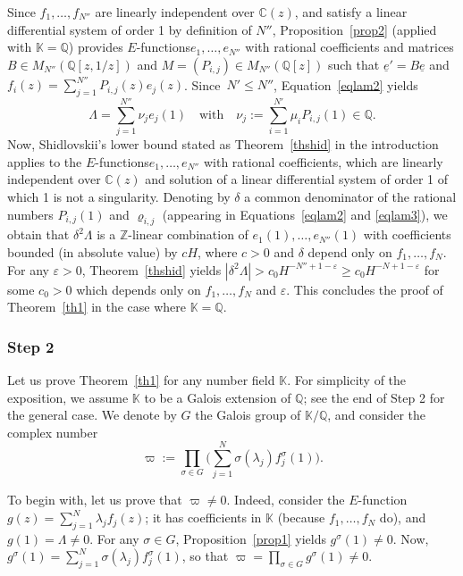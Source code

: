\documentclass[11pt]{article}
\numberwithin{equation}{section}
\newcommand{\Efunction}{$E$\nobreakdash-func\-tion\xspace}
\newcommand{\Efunctions}{$E$\nobreakdash-func\-tions\xspace}
\theoremstyle{definition}
\newcommand{\Z}{\mathbb{Z}}
\newcommand{\Q}{\mathbb{Q}}
\newcommand{\C}{\mathbb{C}}
\newcommand{\K}{\mathbb{K}}
\let\eps\varepsilon
\begin{document}
Since $f_1,\ldots,f_{N''}$ are linearly independent over $\C(z)$, and satisfy a linear differential system of order 1 by definition of $N''$, Proposition~\ref{prop2} (applied with $\mathbb K=\mathbb Q$) provides \Efunctions $e_1,\ldots,e_{N''}$ with rational coefficients and matrices $B\in M_{N''}(\Q[z,1/z])$ and $M = (P_{i,j})\in M_{N''}(\Q[z])$ such that $\underline e' = B \underline e$ and $f_i(z) = \sum_{j=1}^{N''} P_{i,j}(z)e_j(z)$. Since~$N'\leq N''$, Equation~\eqref{eqlam2} yields
\begin{equation}\label{eqlam3}
\Lambda = \sum_{j=1}^{N''} \nu_j e_j(1) \quad \mbox{with} \quad
\nu_j := \sum_{i=1}^{N'} \mu_i P_{i,j}(1)\in\Q.
\end{equation}
Now, Shidlovskii's lower bound stated as Theorem~\ref{thshid} in the introduction
applies to the \Efunctions $e_1,\ldots,e_{N''}$ with rational coefficients, which are linearly independent over $\C(z)$ and solution of a linear differential system of order 1 of which 1 is not a singularity. Denoting by $\delta$ a common denominator of the rational numbers $P_{i,j}(1)$ and $\varrho_{i,j} $ (appearing in Equations~\eqref{eqlam2} and \eqref{eqlam3}), we obtain that $\delta^2 \Lambda $ is a $\Z$-linear combination of $e_1(1),\ldots,e_{N''}(1)$ with coefficients bounded (in absolute value) by $cH$, where $c>0$ and $\delta$ depend only on $f_1,\ldots,f_N$. For any $\eps>0$, Theorem~\ref{thshid} yields $ |\delta^2 \Lambda |>c_0 H^{-N''+1-\eps}\geq c_0 H^{-N+1-\eps}$ for some $c_0>0$ which depends only on $f_1,\ldots,f_N$ and $\eps$. This concludes the proof of Theorem~\ref{th1} in the case where $\K=\Q$.

\subsubsection*{Step 2}
Let us prove Theorem~\ref{th1} for any number field $\K$. For simplicity of the exposition, we assume $\K$ to be a Galois extension of $\Q$; see the end of Step 2 for the general case. We denote by $G$ the Galois group of $\K/\Q$, and consider the complex number
\begin{equation} \label{eqdefvarpi}
\varpi := \prod_{\sigma\in G} \Big( \sum_{j=1}^N \sigma(\lambda_j) f_j^\sigma(1)\Big).
\end{equation}

To begin with, let us prove that $ \varpi \neq 0$. Indeed, consider the \Efunction $g(z) = \sum_{j=1}^N \lambda_j f_j(z)$; it has coefficients in $\K$ (because $f_1,\ldots,f_N$ do), and $g(1) = \Lambda\neq 0$. For any $\sigma \in G$, Proposition~\ref{prop1} yields $g^\sigma(1) \neq 0$. Now, $g^\sigma(1) = \sum_{j=1}^N \sigma(\lambda_j) f_j^\sigma(1)$, so that $\varpi = \prod_{\sigma\in G} g^\sigma(1) \neq 0$.
\end{document}
